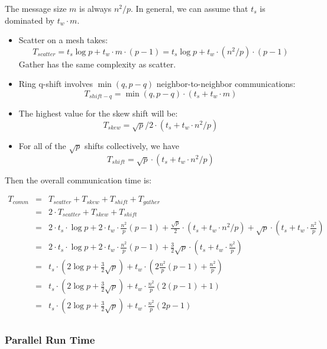 \documentclass{article}
\begin{document}
The message size $m$ is always $n^2/p$. In general, we can assume that $t_s$ is
dominated by $t_w \cdot m$.

\begin{itemize}
	\item Scatter on a mesh takes: $$T_{{scatter}} = t_s
\log{p} + t_w \cdot m  \cdot (p-1) = t_s \log{p} + t_w \cdot (n^2/p) \cdot
(p-1)$$
Gather has the same complexity as scatter.

\item Ring q-shift involves $\min(q, p-q)$ neighbor-to-neighbor communications:
$$T_{{shift-q}} = \min(q,p-q) \cdot (t_s + t_w \cdot m)$$

\item The highest value for the skew shift will be:
$$T_{{skew}} = \sqrt{p}/2 \cdot (t_s + t_w \cdot n^2/p)$$

\item For all of the $\sqrt{p}$ shifts collectively, we have
$$T_{{shift}} = \sqrt{p} \cdot (t_s + t_w \cdot n^2/p)$$

\end{itemize}

Then the overall communication time is:

\begin{eqnarray*}
T_{{comm}} 	&=& T_{{scatter}} + T_{{skew}} + T_{{shift}} + T_{{gather}} \\
			&=& 2 \cdot T_{{scatter}} + T_{{skew}} + T_{{shift}}  \\
			&=& 2 \cdot t_s  \cdot \log{p} + 2 \cdot t_w \cdot \frac{n^2}{p}(p-1) + \frac{\sqrt{p}}{2} \cdot (t_s + t_w \cdot n^2/p) + \sqrt{p} \cdot (t_s + t_w \cdot \frac{n^2}{p}) \\ 
			&=& 2 \cdot t_s \cdot \log{p} + 2 \cdot t_w  \cdot \frac{n^2}{p}(p-1) + \frac{3}{2}\sqrt{p}  \cdot \left(t_s + t_w \cdot \frac{n^2}{p}\right) \\ 
			&=& t_s \cdot \left(2 \log{p} + \frac{3}{2}\sqrt{p}\right) + t_w \cdot \left(2 \frac{n^2}{p}(p-1) + \frac{n^2}{p}\right) \\ 
			&=& t_s \cdot \left(2 \log{p} + \frac{3}{2}\sqrt{p}\right) + t_w \cdot \frac{n^2}{p}(2(p-1) + 1) \\
			&=& t_s \cdot \left(2 \log{p} + \frac{3}{2}\sqrt{p}\right) + t_w \cdot \frac{n^2}{p}(2p-1) \\
\end{eqnarray*}


\subsubsection{Parallel Run Time}
\end{document}
